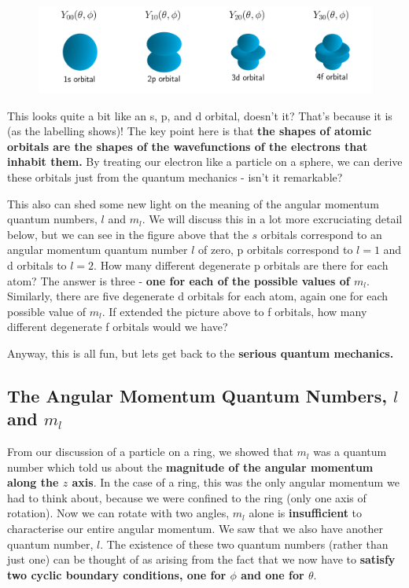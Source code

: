 \documentclass{memoir}[11pt,oneside,a4paper,openany]
\begin{document}
\begin{figure}
	\centering
	\includegraphics[width=\textwidth]{spherical_harmonics}
\end{figure}

This looks quite a bit like an s, p, and d orbital, doesn't it? That's because it is (as the labelling shows)! The key point here is that \textbf{the shapes of atomic orbitals are the shapes of the wavefunctions of the electrons that inhabit them.} By treating our electron like a particle on a sphere, we can derive these orbitals just from the quantum mechanics - isn't it remarkable?

This also can shed some new light on the meaning of the angular momentum quantum numbers, $l$ and $m_l$. We will discuss this in a lot more excruciating detail below, but we can see in the figure above that the $s$ orbitals correspond to an angular momentum quantum number $l$ of zero, p orbitals correspond to $l=1$ and d orbitals to $l=2$. How many different degenerate p orbitals are there for each atom? The answer is three - \textbf{one for each of the possible values of $m_l$}. Similarly, there are five degenerate d orbitals for each atom, again one for each possible value of $m_l$. If extended the picture above to f orbitals, how many different degenerate f orbitals would we have?

Anyway, this is all fun, but lets get back to the \textbf{serious quantum mechanics.}

\subsection{The Angular Momentum Quantum Numbers, $l$ and $m_l$}
From our discussion of a particle on a ring, we showed that $m_l$ was a quantum number which told us about the \textbf{magnitude of the angular momentum along the $z$ axis}. In the case of a ring, this was the only angular momentum we had to think about, because we were confined to the ring (only one axis of rotation). Now we can rotate with two angles, $m_l$ alone is \textbf{insufficient} to characterise our entire angular momentum. We saw that we also have another quantum number, $l$. The existence of these two quantum numbers (rather than just one) can be thought of as arising from the fact that we now have to \textbf{satisfy two cyclic boundary conditions, one for $\phi$ and one for $\theta$}.
\end{document}
